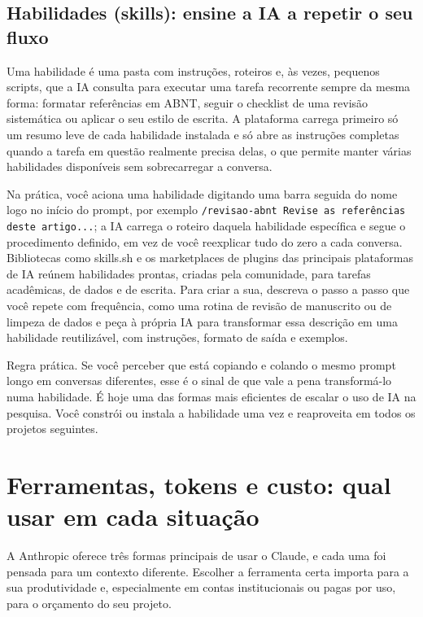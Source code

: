 \documentclass[11pt,a4paper]{article}
\begin{document}
\subsection*{Habilidades (skills): ensine a IA a repetir o seu fluxo}
Uma habilidade é uma pasta com instruções, roteiros e, às vezes, pequenos scripts, que a IA consulta para executar uma tarefa recorrente sempre da mesma forma: formatar referências em ABNT, seguir o checklist de uma revisão sistemática ou aplicar o seu estilo de escrita. A plataforma carrega primeiro só um resumo leve de cada habilidade instalada e só abre as instruções completas quando a tarefa em questão realmente precisa delas, o que permite manter várias habilidades disponíveis sem sobrecarregar a conversa.

Na prática, você aciona uma habilidade digitando uma barra seguida do nome logo no início do prompt, por exemplo \texttt{/revisao-abnt Revise as referências deste artigo...}; a IA carrega o roteiro daquela habilidade específica e segue o procedimento definido, em vez de você reexplicar tudo do zero a cada conversa. Bibliotecas como skills.sh e os marketplaces de plugins das principais plataformas de IA reúnem habilidades prontas, criadas pela comunidade, para tarefas acadêmicas, de dados e de escrita. Para criar a sua, descreva o passo a passo que você repete com frequência, como uma rotina de revisão de manuscrito ou de limpeza de dados e peça à própria IA para transformar essa descrição em uma habilidade reutilizável, com instruções, formato de saída e exemplos.
\begin{dica}
Regra prática. Se você perceber que está copiando e colando o mesmo prompt longo em conversas diferentes, esse é o sinal de que vale a pena transformá-lo numa habilidade. É hoje uma das formas mais eficientes de escalar o uso de IA na pesquisa. Você constrói ou instala a habilidade uma vez e reaproveita em todos os projetos seguintes.
\end{dica}

\clearpage
\section{Ferramentas, tokens e custo: qual usar em cada situação}
\small
A Anthropic oferece três formas principais de usar o Claude, e cada uma foi pensada para um contexto diferente. Escolher a ferramenta certa importa para a sua produtividade e, especialmente em contas institucionais ou pagas por uso, para o orçamento do seu projeto.
\end{document}
